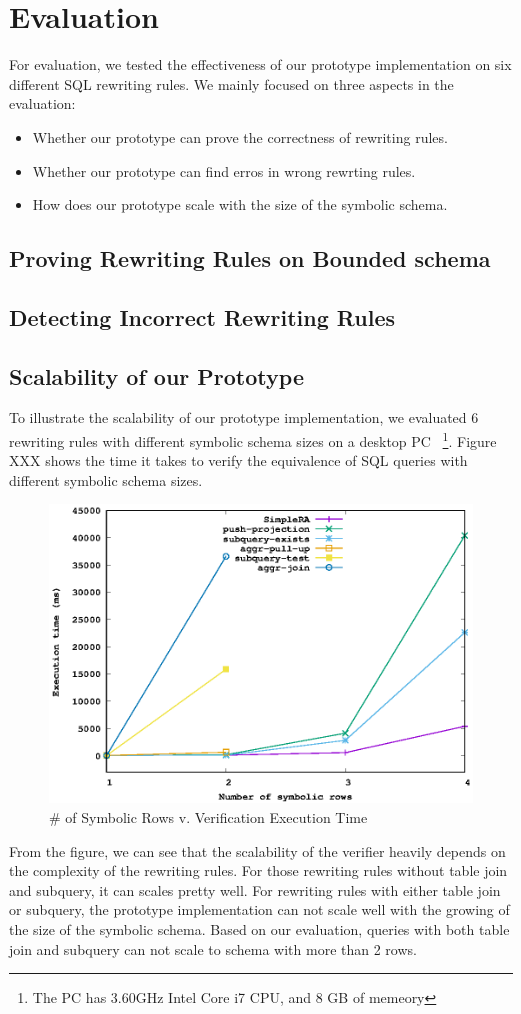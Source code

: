 \section{Evaluation}
For evaluation, we tested the effectiveness of our prototype implementation 
on six different SQL rewriting rules.
We mainly focused on three aspects in the evaluation:
\begin{itemize}
\item Whether our prototype can prove the correctness of rewriting rules.
\item Whether our prototype can find erros in wrong rewrting rules.
\item How does our prototype scale with the size of the symbolic schema.
\end{itemize}

\subsection{Proving Rewriting Rules on Bounded schema}
\subsection{Detecting Incorrect Rewriting Rules}
\subsection{Scalability of our Prototype}
To illustrate the scalability of our prototype implementation, we evaluated
6 rewriting rules with different symbolic schema sizes on a desktop PC
~\footnote{The PC has 3.60GHz Intel Core i7 CPU, and 8 GB of memeory}.
Figure XXX shows the time it takes to verify the equivalence of SQL queries
with different symbolic schema sizes.

\begin{figure}[!htb]
  \centering
  \includegraphics[width=0.7\linewidth]{scale.eps}
  \caption{\# of Symbolic Rows v. Verification Execution Time}
  \label{fig:scale}
\end{figure}

From the figure, we can see that the scalability of the verifier heavily depends 
on the complexity of the rewriting rules.
For those rewriting rules without table join and subquery, it can scales pretty well.
For rewriting rules with either table join or subquery, the prototype implementation can 
not scale well with the growing of the size of the symbolic schema.
Based on our evaluation, queries with both table join and subquery can not scale to schema with
more than 2 rows.
